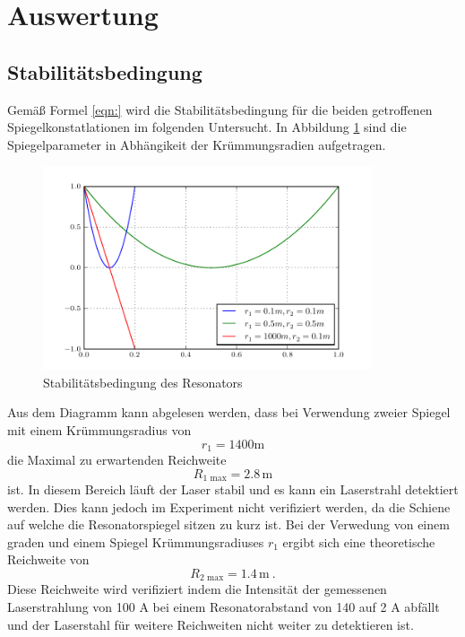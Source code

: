\section{Auswertung}
\label{sec:Auswertung}

\subsection{Stabilitätsbedingung}
Gemäß Formel \ref{eqn:} wird die Stabilitätsbedingung für die beiden getroffenen Spiegelkonstatlationen im folgenden Untersucht. In Abbildung \ref{fig:stabi} sind die Spiegelparameter in Abhängikeit der Krümmungsradien aufgetragen. 
\begin{figure}
  \centering
  \includegraphics[height=6cm]{Stabilisationsparameter.pdf} 
  \caption{Stabilitätsbedingung des Resonators}
  \label{fig:stabi}
\end{figure}
Aus dem Diagramm kann abgelesen werden, dass bei Verwendung zweier Spiegel mit einem Krümmungsradius von 
\begin{equation}
  r_1 = 1400 \text{m}
  \label{eqn:rad1}
\end{equation}
die Maximal zu erwartenden Reichweite
\begin{equation}
  R_\text{1 max} = 2.8 \, \text{m}
  \label{eqn:rmax1}
\end{equation}
ist. In diesem Bereich läuft der Laser stabil und es kann ein Laserstrahl detektiert werden. Dies kann jedoch im Experiment nicht verifiziert werden, da die Schiene auf welche die Resonatorspiegel sitzen zu kurz ist. Bei der Verwedung von einem graden und einem Spiegel Krümmungsradiuses $r_1$ ergibt sich eine theoretische Reichweite von
\begin{equation}
  R_\text{2 max} = 1.4 \, \text{m} \ .
  \label{eqn:rmax2}
\end{equation}
Diese Reichweite wird verifiziert indem die Intensität der gemessenen Laserstrahlung von 100 \mu A bei einem Resonatorabstand von 140 auf 2 \mu A abfällt und der Laserstahl für weitere Reichweiten nicht weiter zu detektieren ist.

